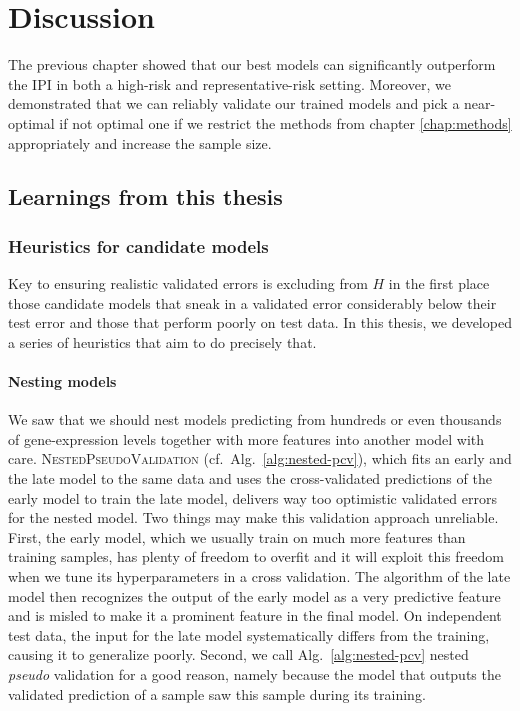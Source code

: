 \chapter{Discussion} \label{chap:discussion}

The previous chapter showed that our best models can significantly outperform the IPI in both 
a high-risk and representative-risk setting. Moreover, we demonstrated that we can reliably validate 
our trained models and pick a near-optimal if not optimal one if we restrict the methods from 
chapter \ref{chap:methods} appropriately and increase the sample size.

\section{Learnings from this thesis}\label{sec:discussion-learning}

\subsection{Heuristics for candidate models}

Key to ensuring realistic validated errors is excluding from $H$ in the first place those candidate 
models that sneak in a validated error considerably below their test error and those that perform 
poorly on test data. In this thesis, we developed a series of heuristics that aim to do precisely 
that.

\subsubsection{Nesting models}

We saw that we should nest models predicting from hundreds or even thousands of 
gene-expression levels together with more features into another model with care. 
\textsc{NestedPseudoValidation} (cf.\ Alg.\ 
\ref{alg:nested-pcv}), which fits an early and the late model to the same data and uses the 
cross-validated predictions of the early model to train the late model, delivers way too optimistic 
validated errors for the nested model. Two things may make this validation approach unreliable.
First, the early model, which we usually train
on much more features than training samples, has plenty of freedom to overfit and it will exploit this 
freedom when we tune its hyperparameters in a cross validation. The algorithm of the late model then 
recognizes the output of the early model as a very predictive feature and is misled to make it 
a prominent feature in the final model. On independent test data, the input for the late model 
systematically differs from the training, causing it to generalize poorly. Second, we call Alg.\ 
\ref{alg:nested-pcv} nested \textit{pseudo} validation for a good reason, namely because the model 
that outputs the validated prediction of a sample saw this sample during its training. 

